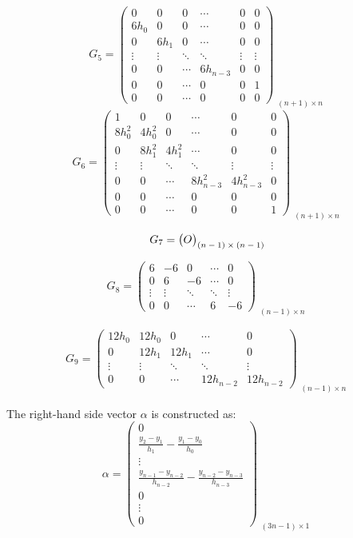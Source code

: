 \documentclass{article}
\begin{document}
\[
G_5 =
\begin{pmatrix}
0 & 0 & 0 & \cdots & 0 & 0 \\
6h_0 & 0 & 0 & \cdots & 0 & 0 \\
0 & 6h_1 & 0 & \cdots & 0 & 0 \\
\vdots & \vdots & \ddots & \ddots & \vdots & \vdots \\
0 & 0 & \cdots & 6h_{n-3} & 0 & 0 \\
0 & 0 & \cdots & 0 & 0 & 1 \\
0 & 0 & \cdots & 0 & 0 & 0
\end{pmatrix}_{\substack{\text{\((n+1)\times n\)}}}
\]
\[
G_6 =
\begin{pmatrix}
1 & 0 & 0 & \cdots & 0 & 0 \\
8h_0^2 & 4h_0^2 & 0 & \cdots & 0 & 0 \\
0 & 8h_1^2 & 4h_1^2 & \cdots & 0 & 0 \\
\vdots & \vdots & \ddots & \ddots & \vdots & \vdots \\
0 & 0 & \cdots & 8h_{n-3}^2 & 4h_{n-3}^2 & 0 \\
0 & 0 & \cdots & 0 & 0 & 0 \\
0 & 0 & \cdots & 0 & 0 & 1
\end{pmatrix}_{\substack{\text{\((n+1)\times n\)}}}
\]

\[
G_7 = \begin{pmatrix}
\large O
\end{pmatrix}_{\substack{\text{\((n-1)\times(n-1)\)}}}
\]

\[
G_8 =
\begin{pmatrix}
6 & -6 & 0 & \cdots & 0 \\
0 & 6 & -6 & \cdots & 0 \\
\vdots & \vdots & \ddots & \ddots & \vdots \\
0 & 0 & \cdots & 6 & -6 
\end{pmatrix}_{\substack{\text{\((n-1)\times n\)}}}
\]

\[
G_9 =
\begin{pmatrix}
12h_0 & 12h_0 & 0 & \cdots & 0 \\
0 & 12h_1 & 12h_1 & \cdots & 0 \\
\vdots & \vdots & \ddots & \ddots & \vdots \\
0 & 0 & \cdots & 12h_{n-2} & 12h_{n-2} 
\end{pmatrix}_{\substack{\text{\((n-1)\times n\)}}}
\]

The right-hand side vector \( \alpha \) is constructed as:
\[
\alpha =
\begin{pmatrix}
0 \\
\frac{y_2-y_1}{h_1}-\frac{y_1-y_0}{h_0} \\
\vdots \\
\frac{y_{n-1}-y_{n-2}}{h_{n-2}}-\frac{y_{n-2}-y_{n-3}}{h_{n-3}} \\
0 \\
\vdots \\
0
\end{pmatrix}_{\substack{\text{\((3n-1)\times1\)}}}
\]
\end{document}
